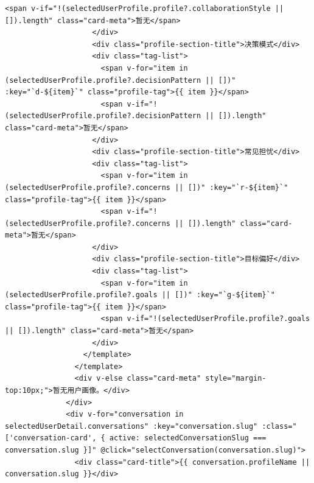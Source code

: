 \documentclass[12pt,a4paper]{article}
\begin{document}
\begin{Verbatim}[fontsize=\footnotesize]
                      <span v-if="!(selectedUserProfile.profile?.collaborationStyle || []).length" class="card-meta">暂无</span>
                    </div>
                    <div class="profile-section-title">决策模式</div>
                    <div class="tag-list">
                      <span v-for="item in (selectedUserProfile.profile?.decisionPattern || [])" :key="`d-${item}`" class="profile-tag">{{ item }}</span>
                      <span v-if="!(selectedUserProfile.profile?.decisionPattern || []).length" class="card-meta">暂无</span>
                    </div>
                    <div class="profile-section-title">常见担忧</div>
                    <div class="tag-list">
                      <span v-for="item in (selectedUserProfile.profile?.concerns || [])" :key="`r-${item}`" class="profile-tag">{{ item }}</span>
                      <span v-if="!(selectedUserProfile.profile?.concerns || []).length" class="card-meta">暂无</span>
                    </div>
                    <div class="profile-section-title">目标偏好</div>
                    <div class="tag-list">
                      <span v-for="item in (selectedUserProfile.profile?.goals || [])" :key="`g-${item}`" class="profile-tag">{{ item }}</span>
                      <span v-if="!(selectedUserProfile.profile?.goals || []).length" class="card-meta">暂无</span>
                    </div>
                  </template>
                </template>
                <div v-else class="card-meta" style="margin-top:10px;">暂无用户画像。</div>
              </div>
              <div v-for="conversation in selectedUserDetail.conversations" :key="conversation.slug" :class="['conversation-card', { active: selectedConversationSlug === conversation.slug }]" @click="selectConversation(conversation.slug)">
                <div class="card-title">{{ conversation.profileName || conversation.slug }}</div>
\end{Verbatim}
\newpage
{}
\fancyhead[R]{}
\end{document}
